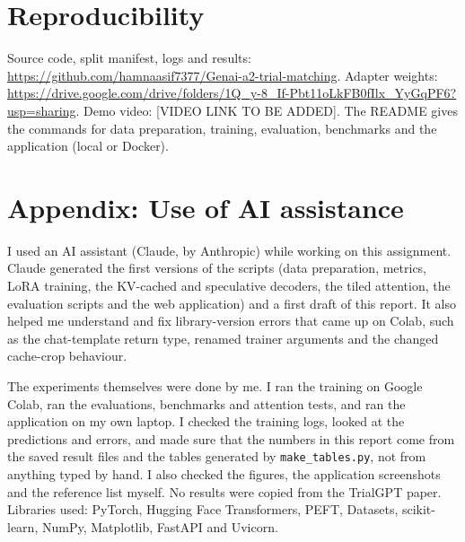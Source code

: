 \documentclass[conference]{IEEEtran}
\begin{document}
\section*{Reproducibility}\label{sec:repro}
Source code, split manifest, logs and results: \url{https://github.com/hamnaasif7377/Genai-a2-trial-matching}. Adapter weights: \url{https://drive.google.com/drive/folders/1Q_y-8_If-Pbt11oLkFB0fIlx_YyGqPF6?usp=sharing}. Demo video: [VIDEO LINK TO BE ADDED]. The README gives the commands for data preparation, training, evaluation, benchmarks and the application (local or Docker).

\section*{Appendix: Use of AI assistance}
I used an AI assistant (Claude, by Anthropic) while working on this assignment. Claude generated the first versions of the scripts (data preparation, metrics, LoRA training, the KV-cached and speculative decoders, the tiled attention, the evaluation scripts and the web application) and a first draft of this report. It also helped me understand and fix library-version errors that came up on Colab, such as the chat-template return type, renamed trainer arguments and the changed cache-crop behaviour.

The experiments themselves were done by me. I ran the training on Google Colab, ran the evaluations, benchmarks and attention tests, and ran the application on my own laptop. I checked the training logs, looked at the predictions and errors, and made sure that the numbers in this report come from the saved result files and the tables generated by \texttt{make\_tables.py}, not from anything typed by hand. I also checked the figures, the application screenshots and the reference list myself. No results were copied from the TrialGPT paper. Libraries used: PyTorch, Hugging Face Transformers, PEFT, Datasets, scikit-learn, NumPy, Matplotlib, FastAPI and Uvicorn.
\end{document}
